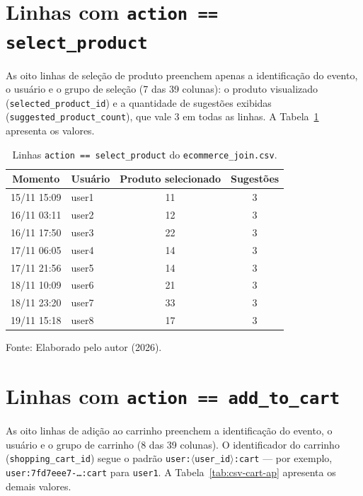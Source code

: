 \section{Linhas com \texttt{action == select\_product}}

As oito linhas de seleção de produto preenchem apenas a identificação do evento, o
usuário e o grupo de seleção (7 das 39 colunas): o produto visualizado
(\texttt{selected\_product\_id}) e a quantidade de sugestões exibidas
(\texttt{suggested\_product\_count}), que vale 3 em todas as linhas. A
Tabela~\ref{tab:csv-select-ap} apresenta os valores.

\begin{table}[H]
  \caption{Linhas \texttt{action == select\_product} do \texttt{ecommerce\_join.csv}.}
  \label{tab:csv-select-ap}
  \centering
  \begin{tabular}{c l c c}
    \toprule
    \textbf{Momento} & \textbf{Usuário} & \textbf{Produto selecionado} & \textbf{Sugestões} \\
    \midrule
    15/11 15:09 & user1 & 11 & 3 \\
    16/11 03:11 & user2 & 12 & 3 \\
    16/11 17:50 & user3 & 22 & 3 \\
    17/11 06:05 & user4 & 14 & 3 \\
    17/11 21:56 & user5 & 14 & 3 \\
    18/11 10:09 & user6 & 21 & 3 \\
    18/11 23:20 & user7 & 33 & 3 \\
    19/11 15:18 & user8 & 17 & 3 \\
    \bottomrule
  \end{tabular}
  \par\vspace{4pt}
  {\footnotesize Fonte: Elaborado pelo autor (2026).}
\end{table}

\section{Linhas com \texttt{action == add\_to\_cart}}

As oito linhas de adição ao carrinho preenchem a identificação do evento, o usuário e
o grupo de carrinho (8 das 39 colunas). O identificador do carrinho
(\texttt{shopping\_cart\_id}) segue o padrão
\texttt{user:$\langle$user\_id$\rangle$:cart} --- por exemplo,
\texttt{user:7fd7eee7-\ldots:cart} para \texttt{user1}. A
Tabela~\ref{tab:csv-cart-ap} apresenta os demais valores.

